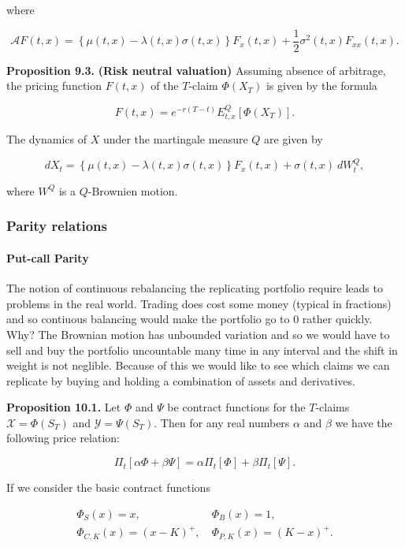 \documentclass[
]{article}
\begin{document}
where

\[
\mathcal{A}F(t,x)=\left\{\mu(t,x)-\lambda(t,x)\sigma(t,x)\right\}F_x(t,x)+\frac{1}{2}\sigma^2(t,x)F_{xx}(t,x).
\]

\textbf{Proposition 9.3.} \textbf{(Risk neutral valuation)} Assuming
absence of arbitrage, the pricing function \(F(t,x)\) of the \(T\)-claim
\(\Phi(X_T)\) is given by the formula

\[
F(t,x)=e^{-r(T-t)}E^Q_{t,x}[\Phi(X_T)].
\]

The dynamics of \(X\) under the martingale measure \(Q\) are given by

\[
dX_t=\left\{\mu(t,x)-\lambda(t,x)\sigma(t,x)\right\}F_x(t,x)+\sigma(t,x)\ dW^Q_t,
\]

where \(W^Q\) is a \(Q\)-Brownien motion.

\hypertarget{parity-relations}{%
\subsubsection{Parity relations}\label{parity-relations}}

\hypertarget{put-call-parity}{%
\paragraph{Put-call Parity}\label{put-call-parity}}

The notion of continuous rebalancing the replicating portfolio require
leads to problems in the real world. Trading does cost some money
(typical in fractions) and so contiuous balancing would make the
portfolio go to 0 rather quickly. Why? The Brownian motion has unbounded
variation and so we would have to sell and buy the portfolio uncountable
many time in any interval and the shift in weight is not neglible.
Because of this we would like to see which claims we can replicate by
buying and holding a combination of assets and derivatives.

\textbf{Proposition 10.1.} Let \(\Phi\) and \(\Psi\) be contract
functions for the \(T\)-claims \(\mathcal{X}=\Phi(S_T)\) and
\(\mathcal{Y}=\Psi(S_T)\). Then for any real numbers \(\alpha\) and
\(\beta\) we have the following price relation:

\[
\Pi_t[\alpha \Phi + \beta\Psi]=\alpha \Pi_t[\Phi]+\beta\Pi_t[\Psi].
\]

If we consider the basic contract functions

\begin{align*}
\Phi_S(x)=x,&\ \Phi_B(x)=1,\\
\Phi_{C,K}(x)=(x-K)^+,&\ \Phi_{P,K}(x)=(K-x)^+.
\end{align*}
\end{document}

